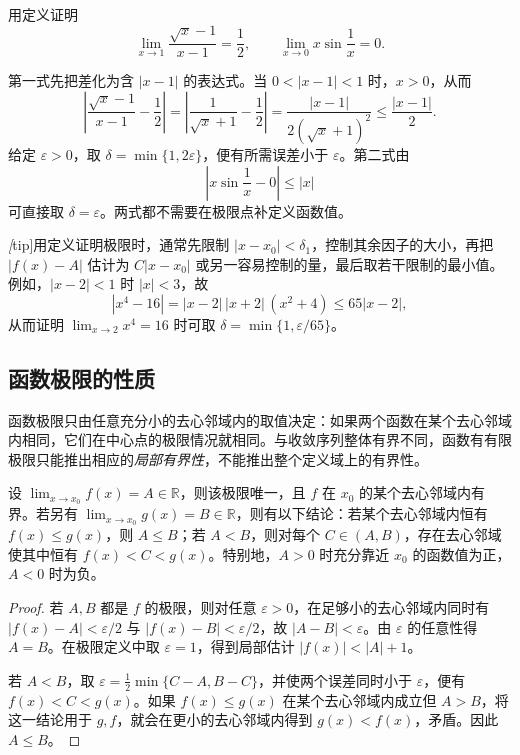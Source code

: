 \begin{example}
\label{ex:epsilon-delta-function-limits}
用定义证明
\[
    \lim_{x\to1}\frac{\sqrt{x}-1}{x-1}=\frac12,
    \qquad
    \lim_{x\to0}x\sin\frac1x=0.
\]
\end{example}

\begin{solve}
第一式先把差化为含 $|x-1|$ 的表达式。当 $0<|x-1|<1$ 时，$x>0$，从而
\[
    \left|\frac{\sqrt{x}-1}{x-1}-\frac12\right|
    =\left|\frac1{\sqrt{x}+1}-\frac12\right|
    =\frac{|x-1|}{2(\sqrt{x}+1)^2}
    \leq\frac{|x-1|}{2}.
\]
给定 $\varepsilon>0$，取 $\delta=\min\{1,2\varepsilon\}$，便有所需误差小于 $\varepsilon$。第二式由
\[
    \left|x\sin\frac1x-0\right|\leq|x|
\]
可直接取 $\delta=\varepsilon$。两式都不需要在极限点补定义函数值。
\end{solve}

\emph[tip]{用定义证明极限时，通常先限制 $|x-x_0|<\delta_1$，控制其余因子的大小，再把 $|f(x)-A|$ 估计为 $C|x-x_0|$ 或另一容易控制的量，最后取若干限制的最小值。}例如，$|x-2|<1$ 时 $|x|<3$，故
\[
    |x^4-16|=|x-2|\,|x+2|\,(x^2+4)\leq65|x-2|,
\]
从而证明 $\lim_{x\to2}x^4=16$ 时可取 $\delta=\min\{1,\varepsilon/65\}$。

\subsection{函数极限的性质}
\label{subsec:properties-of-function-limits}

函数极限只由任意充分小的去心邻域内的取值决定：如果两个函数在某个去心邻域内相同，它们在中心点的极限情况就相同。与收敛序列整体有界不同，函数有有限极限只能推出相应的\emph{局部有界性}，不能推出整个定义域上的有界性。

\begin{theorem}
\label{thm:local-properties-of-function-limits}
设 $\lim_{x\to x_0}f(x)=A\in\mathbb{R}$，则该极限唯一，且 $f$ 在 $x_0$ 的某个去心邻域内有界。若另有 $\lim_{x\to x_0}g(x)=B\in\mathbb{R}$，则有以下结论：若某个去心邻域内恒有 $f(x)\leq g(x)$，则 $A\leq B$；若 $A<B$，则对每个 $C\in(A,B)$，存在去心邻域使其中恒有 $f(x)<C<g(x)$。特别地，$A>0$ 时充分靠近 $x_0$ 的函数值为正，$A<0$ 时为负。
\end{theorem}

\begin{proof}
若 $A,B$ 都是 $f$ 的极限，则对任意 $\varepsilon>0$，在足够小的去心邻域内同时有 $|f(x)-A|<\varepsilon/2$ 与 $|f(x)-B|<\varepsilon/2$，故 $|A-B|<\varepsilon$。由 $\varepsilon$ 的任意性得 $A=B$。在极限定义中取 $\varepsilon=1$，得到局部估计 $|f(x)|<|A|+1$。

若 $A<B$，取 $\varepsilon=\tfrac12\min\{C-A,B-C\}$，并使两个误差同时小于 $\varepsilon$，便有 $f(x)<C<g(x)$。如果 $f(x)\leq g(x)$ 在某个去心邻域内成立但 $A>B$，将这一结论用于 $g,f$，就会在更小的去心邻域内得到 $g(x)<f(x)$，矛盾。因此 $A\leq B$。
\end{proof}

